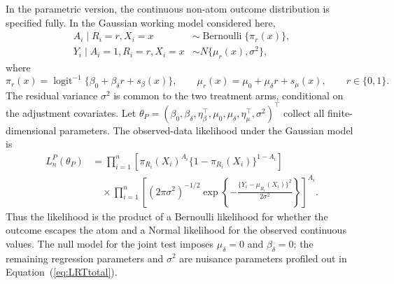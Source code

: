 \documentclass[11pt]{article}
\DeclareMathOperator*{\logit}{logit}
\DeclareMathOperator*{\Bernoulli}{Bernoulli}
\begin{document}
In the parametric version, the continuous non-atom outcome distribution is specified fully. In the Gaussian working model considered here,
\begin{align}
  A_i \mid R_i = r, X_i = x
  &\sim \Bernoulli\{\pi_r(x)\},\nonumber\\
  Y_i \mid A_i = 1, R_i = r, X_i = x
  &\sim N\{\mu_r(x),\sigma^2\},\label{eq:parametric-adjusted-model}
\end{align}
where
\[
  \pi_r(x)
  =
  \logit^{-1}\{\beta_0 + \beta_\delta r + s_\beta(x)\},
  \qquad
  \mu_r(x)
  =
  \mu_0 + \mu_\delta r + s_\mu(x),
  \qquad r \in \{0,1\}.
\]
The residual variance $\sigma^2$ is common to the two treatment arms, conditional on the adjustment covariates. Let $\theta_P = (\beta_0,\beta_\delta,\eta_\beta^\top,\mu_0,\mu_\delta,\eta_\mu^\top,\sigma^2)^\top$ collect all finite-dimensional parameters. The observed-data likelihood under the Gaussian model is
\begin{align}
  L_n^P(\theta_P)
  &=
  \prod_{i = 1}^n
  \left[
    \pi_{R_i}(X_i)^{A_i}
    \{1-\pi_{R_i}(X_i)\}^{1-A_i}
  \right]\nonumber\\
  &\quad \times
  \prod_{i = 1}^n
  \left[
    (2\pi\sigma^2)^{-1/2}
    \exp\left\{-\frac{\{Y_i-\mu_{R_i}(X_i)\}^2}{2\sigma^2}\right\}
  \right]^{A_i}.
  \label{eq:parametric-adjusted-likelihood}
\end{align}
Thus the likelihood is the product of a Bernoulli likelihood for whether the outcome escapes the atom and a Normal likelihood for the observed continuous values. The null model for the joint test imposes $\mu_\delta = 0$ and $\beta_\delta = 0$; the remaining regression parameters and $\sigma^2$ are nuisance parameters profiled out in Equation~(\ref{eq:LRTtotal}).
\end{document}
